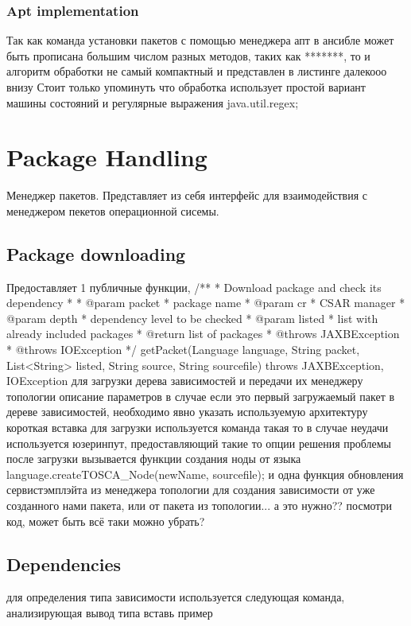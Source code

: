 \subsubsection*{Apt implementation}
Так как команда установки пакетов с помощью менеджера апт в ансибле может быть прописана большим числом разных методов, таких как *******, то и алгоритм обработки не самый компактный и представлен в листинге далекооо внизу
Стоит только упоминуть что обработка использует простой вариант машины состояний и регулярные выражения java.util.regex;

\fi
\section{Package Handling}
Менеджер пакетов. Представляет из себя интерфейс для взаимодействия с менеджером пекетов операционной сисемы. 
\fi
\subsection*{Package downloading}

Предоставляет 1 публичные функции, 
/**
* Download package and check its dependency
* 
* @param packet
*            package name
* @param cr
*            CSAR manager
* @param depth
*            dependency level to be checked
* @param listed
*            list with already included packages
* @return list of packages
* @throws JAXBException
* @throws IOException
*/
getPacket(Language language, String packet,
List<String> listed, String source, String sourcefile)
throws JAXBException, IOException 
для загрузки дерева зависимостей и передачи их менеджеру топологии
описание параметров
в случае если это первый загружаемый пакет в дереве зависимостей, необходимо явно указать используемую архитектуру
короткая вставка
для загрузки используется команда такая то
в случае неудачи используется юзеринпут, предоставляющий такие то опции решения проблемы
после загрузки вызывается функции создания ноды от языка
language.createTOSCA_Node(newName, sourcefile);
и одна функция обновления сервистэмплэйта из менеджера топологии
для создания зависимости от уже созданного нами пакета, или от пакета  из топологии... а это нужно?? посмотри код, может быть всё таки можно убрать?

\fi
\subsection*{Dependencies}
для определения типа зависимости используется следующая команда, анализирующая вывод типа 
вставь пример
\fi
